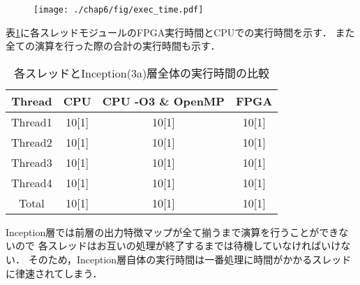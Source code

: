 {\begin{figure}[h]
    \centering
    \texttt{[image: ./chap6/fig/exec\_time.pdf]}
    \caption{}
    \label{fig:exec_graph}
\end{figure}

表\ref{table:exec_time}に各スレッドモジュールのFPGA実行時間とCPUでの実行時間を示す．
また全ての演算を行った際の合計の実行時間も示す．

\begin{table}[p]
    \begin{center}
    \caption{各スレッドとInception(3a)層全体の実行時間の比較}
    \label{table:exec_time}
    \begin{tabular}{|c|c|c|c|} \hline
    \multicolumn{1}{|c|}{Thread} & \multicolumn{1}{|c|}{CPU} & \multicolumn{1}{|c|}{CPU -O3 \& OpenMP} & \multicolumn{1}{|c|}{FPGA} \\ \hline \hline
    Thread1       & 10[1] & 10[1] & 10[1] \\ \hline
    Thread2       & 10[1] & 10[1] & 10[1] \\ \hline
    Thread3       & 10[1] & 10[1] & 10[1] \\ \hline
    Thread4       & 10[1] & 10[1] & 10[1] \\ \hline
    Total         & 10[1] & 10[1] & 10[1] \\ \hline
    \end{tabular}
    \end{center}
\end{table}

Inception層では前層の出力特徴マップが全て揃うまで演算を行うことができないので
各スレッドはお互いの処理が終了するまでは待機していなければいけない．
そのため，Inception層自体の実行時間は一番処理に時間がかかるスレッドに律速されてしまう．
}
